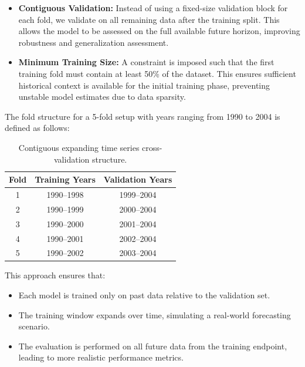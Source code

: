 \documentclass[ruler]{CUP-JNL-EDS}%
\begin{document}
\begin{itemize}
    \item \textbf{Contiguous Validation:} Instead of using a fixed-size validation block for each fold, we validate on all remaining data after the training split. This allows the model to be assessed on the full available future horizon, improving robustness and generalization assessment.
    \vspace{5mm}
    \item \textbf{Minimum Training Size:} A constraint is imposed such that the first training fold must contain at least 50\% of the dataset. This ensures sufficient historical context is available for the initial training phase, preventing unstable model estimates due to data sparsity.
\end{itemize}

The fold structure for a 5-fold setup with years ranging from 1990 to 2004 is defined as follows:

\begin{table}[h!]

\centering
\begin{tabular}{ccc}
\hline
\textbf{Fold} & \textbf{Training Years} & \textbf{Validation Years} \\
\hline
1 & 1990--1998 & 1999--2004 \\
2 & 1990--1999 & 2000--2004 \\
3 & 1990--2000 & 2001--2004 \\
4 & 1990--2001 & 2002--2004 \\
5 & 1990--2002 & 2003--2004 \\
\hline
\end{tabular}
\caption{Contiguous expanding time series cross-validation structure.}
\end{table}

This approach ensures that:
\begin{itemize}
    \item Each model is trained only on past data relative to the validation set.
    \item The training window expands over time, simulating a real-world forecasting scenario.
    \item The evaluation is performed on all future data from the training endpoint, leading to more realistic performance metrics.
\end{itemize}
\end{document}
